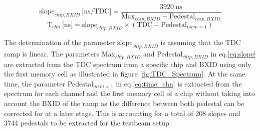 \begin{equation} \label{eq:slope}
	\text{slope}_{chip, BXID} \: \text{[ns/TDC]} = \frac{3920 \: \text{ns}}{\text{Max}_{chip, BXID} - \text{Pedestal}_{chip, BXID}}
\end{equation}
\begin{equation} \label{eq:time_chn}
	\text{T}_{chn} \: \text{[ns]} = \text{slope}_{chip, BXID} \times (\text{TDC} - \text{Pedestal}_{mem=1} )
\end{equation}

The determination of the parameter $\text{slope}_{chip, BXID}$ is assuming that the TDC ramp is linear. The parameters Max$_{chip, BXID}$ and Pedestal$_{chip, BXID}$ in eq.\ref{eq:slope} are extracted from the TDC spectrum from a specific chip and BXID using only the first memory cell as illustrated in figure \ref{fig:TDC_Spectrum}. At the same time, the parameter Pedestal$_{mem=1}$ in eq.\ref{eq:time_chn} is extracted from the spectrum for each channel and the first memory cell of a chip without taking into account the BXID of the ramp as the difference between both pedestal can be corrected for at a later stage. This is accounting for a total of 208 slopes and 3744 pedestals to be extracted for the testbeam setup.

